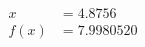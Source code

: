 \documentclass[preview]{standalone}
\begin{document}
\begin{align*}
x &= 4.8756\\f(x) &= 7.9980520
\end{align*}
\end{document}
